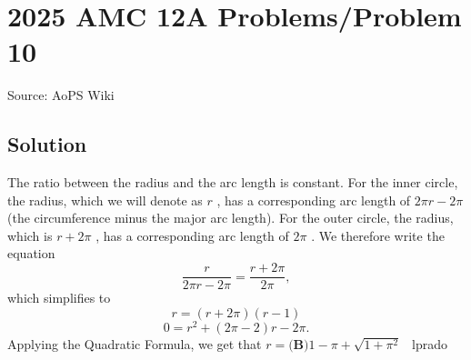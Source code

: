 \documentclass[12pt]{article}
\begin{document}
\section*{{2025 AMC 12A Problems/Problem 10}}
Source: AoPS Wiki

\subsection*{Solution}
The ratio between the radius and the arc length is constant. For the inner circle, the radius, which we will denote as $r$ , has a corresponding arc length of $2\pi r - 2\pi$ (the circumference minus the major arc length). For the outer circle, the radius, which is $r + 2\pi$ , has a corresponding arc length of $2\pi$ . We therefore write the equation \[\frac{r}{2\pi r - 2\pi} = \frac{r+2\pi}{2\pi},\] which simplifies to \[r = (r+2\pi)(r-1)\] \[0 = r^2 + (2\pi-2)r - 2\pi.\] Applying the Quadratic Formula, we get that $r =\boxed{\textbf{(B)} 1 - \pi + \sqrt{1 +\pi^2}}$ ~lprado
\end{document}
